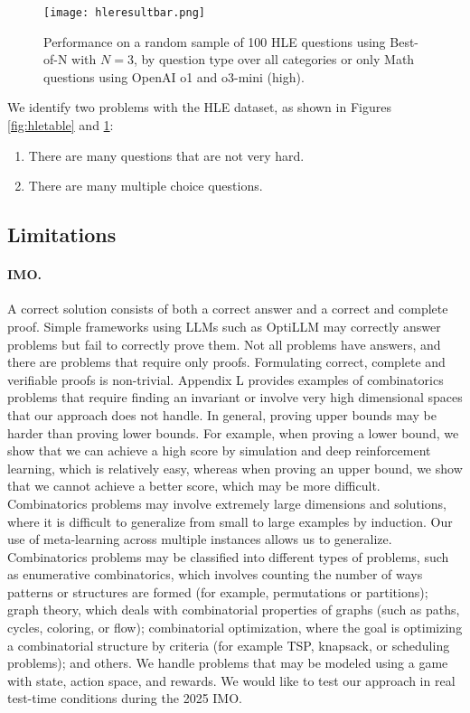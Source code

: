 \begin{figure}[b!]
  \centering
  \texttt{[image: hleresultbar.png]}
  \caption{Performance on a random sample of 100 HLE questions using Best-of-N with $N=3$, by question type over all categories or only Math questions using OpenAI o1 and o3-mini (high).}
  \label{fig:hlebar}
\end{figure}

We identify two problems with the HLE dataset, as shown in Figures \ref{fig:hletable} and \ref{fig:hlebar}:
\begin{enumerate}
\item There are many questions that are not very hard.
\item There are many multiple choice questions.
\end{enumerate}

\subsection{Limitations}

\paragraph{IMO.}
A correct solution consists of both a correct answer and a correct and complete proof. Simple frameworks using LLMs such as OptiLLM may correctly answer problems but fail to correctly prove them. Not all problems have answers, and there are problems that require only proofs. Formulating correct, complete and verifiable proofs is non-trivial. Appendix L provides examples of combinatorics problems that require finding an invariant or involve very high dimensional spaces that our approach does not handle. In general, proving upper bounds may be harder than proving lower bounds. For example, when proving a lower bound, we show that we can achieve a high score by simulation and deep reinforcement learning, which is relatively easy, whereas when proving an upper bound, we show that we cannot achieve a better score, which may be more difficult. Combinatorics problems may involve extremely large dimensions and solutions, where it is difficult to generalize from small to large examples by induction. Our use of meta-learning across multiple instances allows us to generalize. Combinatorics problems may be classified into different types of problems, such as enumerative combinatorics, which involves counting the number of ways patterns or structures are formed (for example, permutations or partitions); graph theory, which deals with combinatorial properties of graphs (such as paths, cycles, coloring, or flow); combinatorial optimization, where the goal is optimizing a combinatorial structure by criteria (for example TSP, knapsack, or scheduling problems); and others. We handle problems that may be modeled using a game with state, action space, and rewards. We would like to test our approach in real test-time conditions during the 2025 IMO.
 
